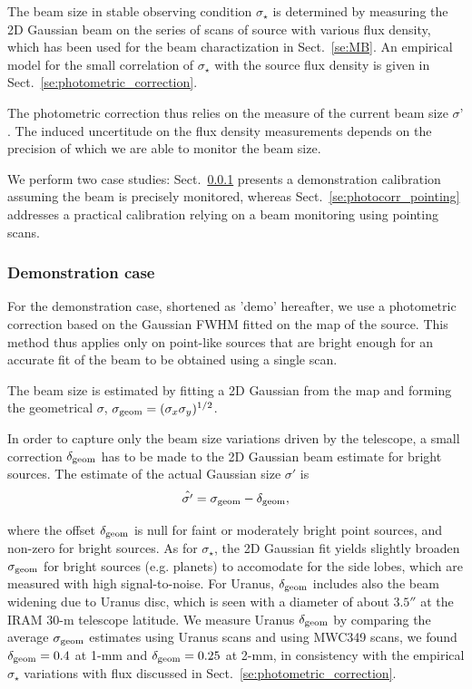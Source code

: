 The beam size in stable observing condition $\sigma_\star$ is
determined by measuring the 2D Gaussian beam on the series of scans of
source with various flux density, which has been used for the beam
charactization in Sect.~\ref{se:MB}.
An empirical model for the small correlation of
$\sigma_\star$ with the source flux density is given in
Sect.~\ref{se:photometric_correction}.

The photometric correction thus relies on the measure of the current beam
size $\sigma ’$. The induced uncertitude on the flux density
measurements depends on the precision of which we are able to monitor
the beam size. 

We perform two case studies: Sect.~\ref{se:photocorr_demo} presents a demonstration
calibration assuming the beam is precisely monitored, whereas
Sect.~\ref{se:photocorr_pointing} addresses a practical calibration relying
on a beam monitoring using pointing scans. 

\subsubsection{Demonstration case}
\label{se:photocorr_demo}

For the demonstration case, shortened as 'demo' hereafter, we use a
photometric correction based on the Gaussian FWHM fitted on the map
of the source. This method thus applies only on point-like
sources that are bright enough for an accurate fit of the beam to be
obtained using a single scan.  

The beam size is estimated by fitting a 2D Gaussian from the map and
forming the geometrical $\sigma$,
$\sigma_{\rm{geom}} = (\sigma_x \sigma_y)^{1/2}$. 

In order to capture only the beam size variations driven by the
telescope, a small correction $\delta_{\rm{geom}}$ has to be made to
the 2D Gaussian beam estimate for bright sources. The estimate of the
actual Gaussian size $\sigma '$ is
\begin{equation}
  \hat{\sigma '} = \sigma_{\rm{geom}} - \delta_{\rm{geom}}, 
\end{equation} 

where the offset $\delta_{\rm{geom}}$ is null for faint or moderately
bright point sources, and non-zero for bright sources.
As for $\sigma_\star$,  the 2D Gaussian fit yields slightly broaden
$\sigma_{\rm{geom}}$ for bright sources (e.g. planets) to accomodate
for the side lobes, which are measured with high signal-to-noise.
For Uranus, $\delta_{\rm{geom}}$ includes also the beam widening due
to Uranus disc, which is seen with a diameter of about $3.5''$ at the
IRAM 30-m telescope latitude. We measure Uranus $\delta_{\rm{geom}}$
by comparing the average $\sigma_{\rm{geom}}$ estimates using Uranus
scans and using MWC349 scans, we found $\delta_{\rm{geom}} = 0.4$ at
1-mm and $\delta_{\rm{geom}} = 0.25$ at 2-mm, in consistency with the empirical
$\sigma_\star$ variations with flux discussed in
Sect.~\ref{se:photometric_correction}.


